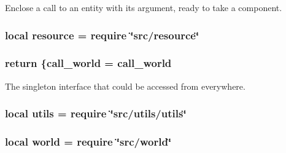 Enclose a call to an entity with its argument, ready to take a component. 

\hypertarget{controller_8lua_a24ad487107aaa56bef35825abbe9773d}{
\subsubsection[{resource}]{\setlength{\rightskip}{0pt plus 5cm}local resource = require \char`\"{}src/resource\char`\"{}}}\label{controller_8lua_a24ad487107aaa56bef35825abbe9773d}
\hypertarget{controller_8lua_a9717e7bbecb906637e86cef6da3d83c2}{
\subsubsection[{return}]{\setlength{\rightskip}{0pt plus 5cm}return \{{\bf call\-\_\-world} = {\bf call\-\_\-world}}}\label{controller_8lua_a9717e7bbecb906637e86cef6da3d83c2}


The singleton interface that could be accessed from everywhere. 

\hypertarget{controller_8lua_a9b2ba82def3d3656dc370bac0a641700}{
\subsubsection[{utils}]{\setlength{\rightskip}{0pt plus 5cm}local utils = require \char`\"{}src/utils/utils\char`\"{}}}\label{controller_8lua_a9b2ba82def3d3656dc370bac0a641700}
\hypertarget{controller_8lua_a054520f514ab0d9a9b0fede5a23db9f7}{
\subsubsection[{world}]{\setlength{\rightskip}{0pt plus 5cm}local world = require \char`\"{}src/world\char`\"{}}}\label{controller_8lua_a054520f514ab0d9a9b0fede5a23db9f7}
